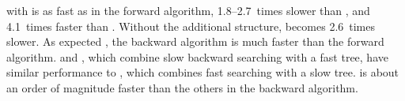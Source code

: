 \RST{} with \rselect{} is as fast as \CSTsada{} in the forward algorithm,
1.8\nobreakdash--2.7~times slower than \CSTnpr, and 4.1~times faster than \FCST. Without
the additional structure, \RST{} becomes 2.6~times slower. As expected \cite{Ohlebusch2010a},
the backward algorithm is much faster than the forward algorithm. \CSTsada{} and \RST,
which combine slow backward searching with a fast tree, have similar
performance to \FCST, which combines fast searching with a slow tree. \CSTnpr{} is about
an order of magnitude faster than the others in the backward algorithm.
